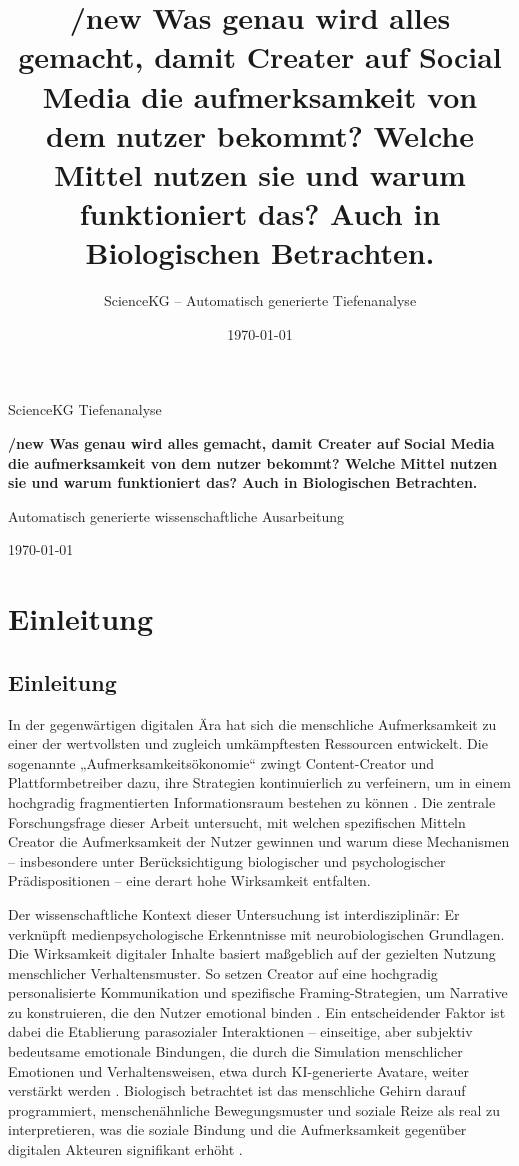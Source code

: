 \documentclass[11pt,a4paper]{article}
\title{/new Was genau wird alles gemacht, damit Creater auf Social Media die aufmerksamkeit von dem nutzer bekommt? Welche Mittel nutzen sie und warum funktioniert das? Auch in Biologischen Betrachten.}
\author{ScienceKG -- Automatisch generierte Tiefenanalyse}
\date{\today}
\begin{document}
\begin{titlepage}
\centering
{\large ScienceKG \textendash{} Tiefenanalyse\par}
\vspace{2.5cm}
{\huge\bfseries /new Was genau wird alles gemacht, damit Creater auf Social Media die aufmerksamkeit von dem nutzer bekommt? Welche Mittel nutzen sie und warum funktioniert das? Auch in Biologischen Betrachten.\par}
\vspace{2cm}
{\large Automatisch generierte wissenschaftliche Ausarbeitung\par}
\vfill
{\large \today\par}
\end{titlepage}
\tableofcontents
\newpage
\section{Einleitung}

\subsection{Einleitung}

In der gegenwärtigen digitalen Ära hat sich die menschliche Aufmerksamkeit zu einer der wertvollsten und zugleich umkämpftesten Ressourcen entwickelt. Die sogenannte „Aufmerksamkeitsökonomie“ zwingt Content-Creator und Plattformbetreiber dazu, ihre Strategien kontinuierlich zu verfeinern, um in einem hochgradig fragmentierten Informationsraum bestehen zu können \autocite{doaj_10febcbb5e60420699a1d4570a075832}. Die zentrale Forschungsfrage dieser Arbeit untersucht, mit welchen spezifischen Mitteln Creator die Aufmerksamkeit der Nutzer gewinnen und warum diese Mechanismen – insbesondere unter Berücksichtigung biologischer und psychologischer Prädispositionen – eine derart hohe Wirksamkeit entfalten.

Der wissenschaftliche Kontext dieser Untersuchung ist interdisziplinär: Er verknüpft medienpsychologische Erkenntnisse mit neurobiologischen Grundlagen. Die Wirksamkeit digitaler Inhalte basiert maßgeblich auf der gezielten Nutzung menschlicher Verhaltensmuster. So setzen Creator auf eine hochgradig personalisierte Kommunikation und spezifische Framing-Strategien, um Narrative zu konstruieren, die den Nutzer emotional binden \autocite{arxiv_2406_13820}. Ein entscheidender Faktor ist dabei die Etablierung parasozialer Interaktionen – einseitige, aber subjektiv bedeutsame emotionale Bindungen, die durch die Simulation menschlicher Emotionen und Verhaltensweisen, etwa durch KI-generierte Avatare, weiter verstärkt werden \autocite{europepmc_42073973}. Biologisch betrachtet ist das menschliche Gehirn darauf programmiert, menschenähnliche Bewegungsmuster und soziale Reize als real zu interpretieren, was die soziale Bindung und die Aufmerksamkeit gegenüber digitalen Akteuren signifikant erhöht \autocite{arxiv_2301_09025}.
\end{document}
